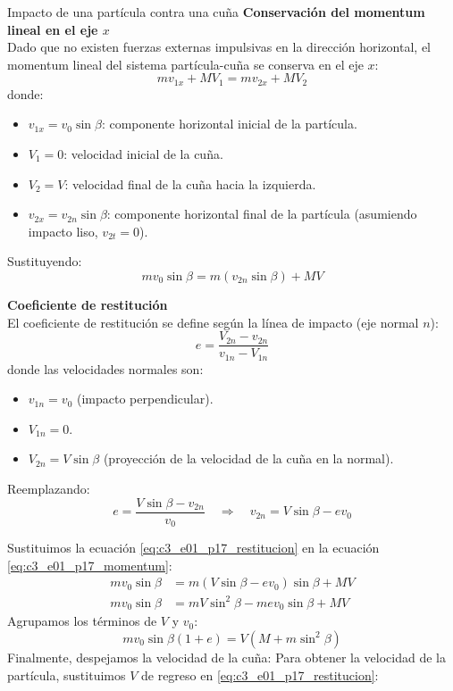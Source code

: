 \begin{solucion}{Impacto de una partícula contra una cuña}
\textbf{Conservación del momentum lineal en el eje $x$}\\
Dado que no existen fuerzas externas impulsivas en la dirección horizontal, el momentum lineal del sistema partícula-cuña se conserva en el eje $x$:
\begin{equation}
    m v_{1x} + M V_1 = m v_{2x} + M V_2
\end{equation}
donde:
\begin{itemize}
    \item $v_{1x} = v_0 \sin\beta$: componente horizontal inicial de la partícula.
    \item $V_1 = 0$: velocidad inicial de la cuña.
    \item $V_2 = V$: velocidad final de la cuña hacia la izquierda.
    \item $v_{2x} = v_{2n} \sin\beta$: componente horizontal final de la partícula (asumiendo impacto liso, $v_{2t} = 0$).
\end{itemize}
Sustituyendo:
\begin{equation}
    m v_0 \sin\beta = m (v_{2n} \sin\beta) + M V \label{eq:c3_e01_p17_momentum}
\end{equation}

\textbf{Coeficiente de restitución}\\
El coeficiente de restitución se define según la línea de impacto (eje normal $n$):
\begin{equation}
    e = \frac{V_{2n} - v_{2n}}{v_{1n} - V_{1n}}
\end{equation}
donde las velocidades normales son:
\begin{itemize}
    \item $v_{1n} = v_0$ (impacto perpendicular).
    \item $V_{1n} = 0$.
    \item $V_{2n} = V \sin\beta$ (proyección de la velocidad de la cuña en la normal).
\end{itemize}
Reemplazando:
\begin{equation}
    e = \frac{V \sin\beta - v_{2n}}{v_0} \quad\Longrightarrow\quad v_{2n} = V \sin\beta - e v_0 \label{eq:c3_e01_p17_restitucion}
\end{equation}

Sustituimos la ecuación \eqref{eq:c3_e01_p17_restitucion} en la ecuación \eqref{eq:c3_e01_p17_momentum}:
\begin{align*}
    m v_0 \sin\beta &= m (V \sin\beta - e v_0) \sin\beta + M V \\
    m v_0 \sin\beta &= m V \sin^2\beta - m e v_0 \sin\beta + M V
\end{align*}
Agrupamos los términos de $V$ y $v_0$:
$$m v_0 \sin\beta (1 + e) = V (M + m \sin^2\beta)$$
Finalmente, despejamos la velocidad de la cuña:
Para obtener la velocidad de la partícula, sustituimos $V$ de regreso en \eqref{eq:c3_e01_p17_restitucion}:


\end{solucion}
